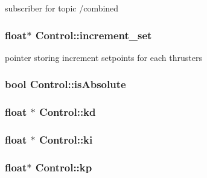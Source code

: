 subscriber for topic /combined 

\subsubsection[{\texorpdfstring{increment\+\_\+set}{increment_set}}]{\setlength{\rightskip}{0pt plus 5cm}float$\ast$ Control\+::increment\+\_\+set\hspace{0.3cm}{\ttfamily [private]}}\hypertarget{classControl_abef1251d931160009073651757563fc9}{}\label{classControl_abef1251d931160009073651757563fc9}


pointer storing increment setpoints for each thrusters 

\subsubsection[{\texorpdfstring{is\+Absolute}{isAbsolute}}]{\setlength{\rightskip}{0pt plus 5cm}bool Control\+::is\+Absolute\hspace{0.3cm}{\ttfamily [private]}}\hypertarget{classControl_aa01779cbcdef554d2e6c77e05d7b521a}{}\label{classControl_aa01779cbcdef554d2e6c77e05d7b521a}
\subsubsection[{\texorpdfstring{kd}{kd}}]{\setlength{\rightskip}{0pt plus 5cm}float $\ast$ Control\+::kd\hspace{0.3cm}{\ttfamily [private]}}\hypertarget{classControl_a9eaa6a8852f1a6674f39104b313568b3}{}\label{classControl_a9eaa6a8852f1a6674f39104b313568b3}
\subsubsection[{\texorpdfstring{ki}{ki}}]{\setlength{\rightskip}{0pt plus 5cm}float $\ast$ Control\+::ki\hspace{0.3cm}{\ttfamily [private]}}\hypertarget{classControl_aedb7684fb944d24bdf1d803f823c156c}{}\label{classControl_aedb7684fb944d24bdf1d803f823c156c}
\subsubsection[{\texorpdfstring{kp}{kp}}]{\setlength{\rightskip}{0pt plus 5cm}float$\ast$ Control\+::kp\hspace{0.3cm}{\ttfamily [private]}}\hypertarget{classControl_a3c190679233ca3cceaf3f3e2a00fb377}{}\label{classControl_a3c190679233ca3cceaf3f3e2a00fb377}
